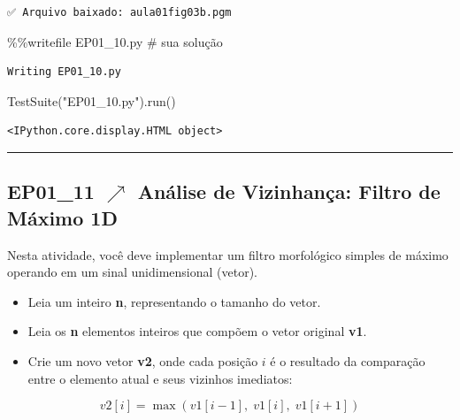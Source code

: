 \documentclass[
  portuguese,
  letterpaper,
  openany,
  oneside,
  12pt,
  a4paper]{book}
\newenvironment{Shaded}{\begin{snugshade}}{\end{snugshade}}
\newcommand{\CommentTok}[1]{\textcolor[rgb]{0.37,0.37,0.37}{#1}}
\newcommand{\NormalTok}[1]{\textcolor[rgb]{0.00,0.23,0.31}{#1}}
\newcommand{\OperatorTok}[1]{\textcolor[rgb]{0.37,0.37,0.37}{#1}}
\newcommand{\StringTok}[1]{\textcolor[rgb]{0.13,0.47,0.30}{#1}}
\providecommand{\tightlist}{%
  \setlength{\itemsep}{0pt}\setlength{\parskip}{0pt}}
\begin{document}
\begin{tcolorbox}
\begin{verbatim}
✅ Arquivo baixado: aula01fig03b.pgm
\end{verbatim}

\begin{Shaded}
\begin{Highlighting}[]
\OperatorTok{\%\%}\NormalTok{writefile EP01\_10.py}
\CommentTok{\# sua solução}
\end{Highlighting}
\end{Shaded}

\begin{verbatim}
Writing EP01_10.py
\end{verbatim}

\begin{Shaded}
\begin{Highlighting}[]
\NormalTok{TestSuite(}\StringTok{"EP01\_10.py"}\NormalTok{).run()}
\end{Highlighting}
\end{Shaded}

\begin{verbatim}
<IPython.core.display.HTML object>
\end{verbatim}

\begin{center}\rule{0.5\linewidth}{0.5pt}\end{center}

\subsection{\texorpdfstring{EP01\_11 $\nearrow$ Análise de Vizinhança:
Filtro de Máximo
1D}{EP01\_11  Análise de Vizinhança: Filtro de Máximo 1D}}\label{ep01_11-anuxe1lise-de-vizinhanuxe7a-filtro-de-muxe1ximo-1d}

Nesta atividade, você deve implementar um filtro morfológico simples de
máximo operando em um sinal unidimensional (vetor).

\begin{itemize}
\tightlist
\item
  Leia um inteiro \textbf{n}, representando o tamanho do vetor.
\item
  Leia os \textbf{n} elementos inteiros que compõem o vetor original
  \textbf{v1}.
\item
  Crie um novo vetor \textbf{v2}, onde cada posição \(i\) é o resultado
  da comparação entre o elemento atual e seus vizinhos imediatos:
\end{itemize}

\[v2[i] = \max(v1[i-1],\; v1[i],\; v1[i+1])\]


\end{tcolorbox}
\end{document}
